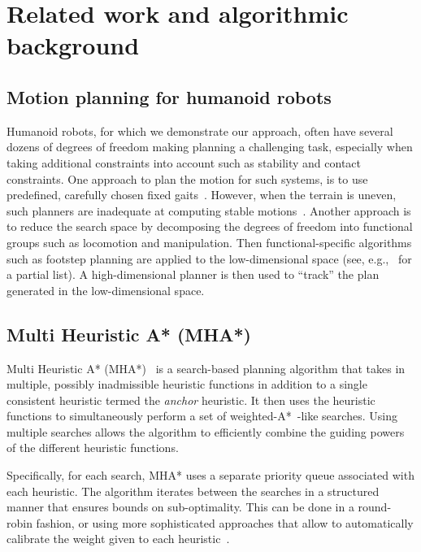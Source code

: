 \documentclass{article}
\begin{document}
\section{Related work and algorithmic background}
\subsection{Motion planning for humanoid robots}
\label{sec:rel}
Humanoid robots, for which we demonstrate our approach, often have several dozens of degrees of freedom making planning a challenging task, especially when taking additional constraints into account such as stability and contact constraints.
One approach to plan the motion for such systems, is to use predefined, carefully chosen fixed gaits~\cite{KKKHKHAI04}. 
However, when the terrain is uneven, such planners are inadequate at computing stable motions~\cite{HBLHW08}.
Another approach is to reduce the search space by decomposing the degrees of freedom into functional groups such as locomotion and manipulation.
Then functional-specific algorithms such as footstep planning are applied to the low-dimensional space (see, e.g.,~\cite{CLCKHK05,KNKII01,PSBLY12,XCXZC09,KKNII02} for a partial list).
A high-dimensional planner is then used to ``track'' the plan generated in the low-dimensional space.


\subsection{Multi Heuristic A* (MHA*)}
\label{sec:mha}
Multi Heuristic A* (MHA*)~\cite{ASNHL16,NAL15} is a search-based planning algorithm that takes in multiple, possibly inadmissible heuristic functions in addition to a single consistent heuristic termed the \emph{anchor} heuristic.
It then uses the heuristic functions to simultaneously perform a set of weighted-A*~\cite{pohl1970first}-like searches.
Using multiple searches allows the algorithm to efficiently combine the guiding powers of the different heuristic functions. 

Specifically, for each search, MHA* uses a separate priority queue associated with each heuristic. 
The algorithm iterates between the searches in a structured manner that ensures bounds on sub-optimality. 
This can be done in a round-robin fashion, or using more 
sophisticated approaches that allow to automatically calibrate the weight given to each heuristic~\cite{PNAL15}.
\end{document}
